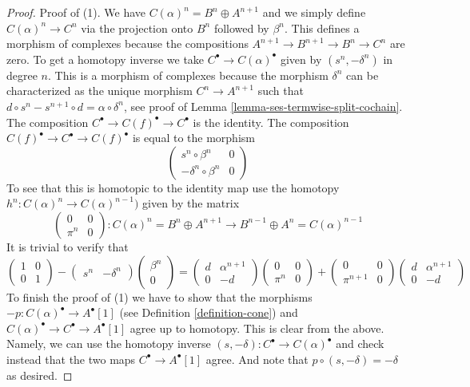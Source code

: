 \begin{proof}
Proof of (1). We have $C(\alpha)^n = B^n \oplus A^{n + 1}$
and we simply define $C(\alpha)^n \to C^n$ via the projection
onto $B^n$ followed by $\beta^n$. This defines
a morphism of complexes because the compositions
$A^{n + 1} \to B^{n + 1} \to B^n \to C^n$ are zero.
To get a homotopy inverse we take
$C^\bullet \to C(\alpha)^\bullet$ given by
$(s^n , -\delta^n)$ in degree $n$. This is a morphism of complexes
because the morphism $\delta^n$ can be characterized as the
unique morphism $C^n \to A^{n + 1}$ such that
$d \circ s^n - s^{n + 1} \circ d = \alpha \circ \delta^n$,
see proof of Lemma \ref{lemma-ses-termwise-split-cochain}. The composition
$C^\bullet \to C(f)^\bullet \to C^\bullet$ is the identity.
The composition $C(f)^\bullet \to C^\bullet \to C(f)^\bullet$
is equal to the morphism
$$
\left(
\begin{matrix}
s^n \circ \beta^n & 0 \\
-\delta^n \circ \beta^n & 0
\end{matrix}
\right)
$$
To see that this is homotopic to the identity map
use the homotopy $h^n : C(\alpha)^n \to C(\alpha)^{n - 1})$
given by the matrix
$$
\left(
\begin{matrix}
0 & 0 \\
\pi^n & 0
\end{matrix}
\right) : C(\alpha)^n = B^n \oplus A^{n + 1} \to
B^{n - 1} \oplus A^n = C(\alpha)^{n - 1}
$$
It is trivial to verify that
$$
\left(
\begin{matrix}
1 & 0 \\
0 & 1
\end{matrix}
\right)
-
\left(
\begin{matrix}
s^n &
-\delta^n
\end{matrix}
\right)
\left(
\begin{matrix}
\beta^n \\
0
\end{matrix}
\right)
=
\left(
\begin{matrix}
d & \alpha^{n + 1} \\
0 & -d
\end{matrix}
\right)
\left(
\begin{matrix}
0 & 0 \\
\pi^n & 0
\end{matrix}
\right)
+
\left(
\begin{matrix}
0 & 0 \\
\pi^{n + 1} & 0
\end{matrix}
\right)
\left(
\begin{matrix}
d & \alpha^{n + 1} \\
0 & -d
\end{matrix}
\right)
$$
To finish the proof of (1) we have to show that the morphisms
$-p : C(\alpha)^\bullet \to A^\bullet[1]$ (see
Definition \ref{definition-cone})
and  $C(\alpha)^\bullet \to C^\bullet \to A^\bullet[1]$ agree up
to homotopy. This is clear from the above. Namely, we can use the homotopy
inverse $(s, -\delta) : C^\bullet \to C(\alpha)^\bullet$
and check instead that the two maps
$C^\bullet \to A^\bullet[1]$ agree. And note that
$p \circ (s, -\delta) = -\delta$ as desired.


\end{proof}
